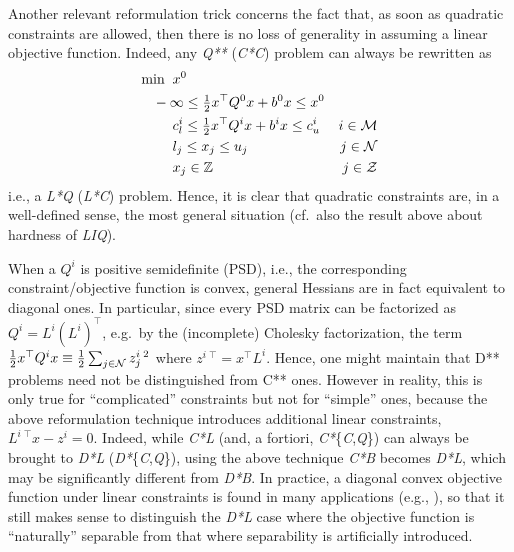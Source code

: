 Another relevant reformulation trick concerns the fact that, as soon as quadratic constraints are allowed, then there is no loss of generality in assuming a linear objective function. Indeed, any \textit{Q**} (\textit{C*C}) problem can always be rewritten as
%
\begin{align*}
 \min \;\;
 & x^0 \\
 & \hspace*{-5mm} -\infty \leq {\textstyle \half} x^\top Q^0 x + b^0 x \leq x^0 & \\
 & c^i_l \leq {\textstyle \half} x^\top Q^i x + b^i x \leq c^i_u & i \in \Mcm \\
 & l_j \leq x_j \leq u_j & j \in \Mcn  \\
 & x_j \in \mathbb{Z} & j \in \Mcz
\end{align*}
%
i.e., a \textit{L*Q} (\textit{L*C}) problem. Hence, it is clear that quadratic constraints are, in a well-defined sense, the most general situation (cf.~also the result above about hardness of \textit{LIQ}).

When a $Q^i$ is positive semidefinite (PSD), i.e., the corresponding constraint/objective function is convex, general Hessians are in fact equivalent to diagonal ones. In particular, since every PSD matrix can be factorized as $Q^i = L^i (L^i)^\top$, e.g.~by the (incomplete) Cholesky factorization, the term $\frac{1}{2} x^\top Q^i x \equiv \frac{1}{2} \sum_{j \in \mathcal{N}} z^{i\;2}_j$ where $z^{i\;\top} = x^\top L^i$. Hence, one might maintain that D** problems need not be distinguished from C** ones. However in reality, this is only true for ``complicated'' constraints but not for ``simple'' ones, because the above reformulation technique introduces additional linear constraints, $L^{i\;\top} x - z^i = 0$. Indeed, while \textit{C*L} (and, a fortiori, \textit{C*}\{\textit{C},\textit{Q}\}) can always be brought to \textit{D*L} (\textit{D*}\{\textit{C},\textit{Q}\}), using the above technique \textit{C*B} becomes \textit{D*L}, which may be significantly different from \textit{D*B}. In practice, a diagonal convex objective function under linear constraints is found in many applications (e.g., \cite{FrFG16,FrGe06a,FrGe09a,FGGP11}), so that it still makes sense to distinguish the \textit{D*L} case where the objective function is ``naturally'' separable from that where separability is artificially introduced.

